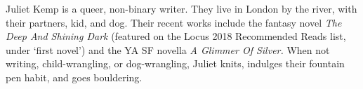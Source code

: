 {Juliet Kemp} is a queer, non-binary writer. They live in London by
the river, with their partners, kid, and dog. Their recent works
include the fantasy novel \textit{The Deep And Shining Dark} (featured
on the Locus 2018 Recommended Reads list, under `first novel') and the
YA SF novella \textit{A Glimmer Of Silver.}  When not writing,
child-wrangling, or dog-wrangling, Juliet knits, indulges their
fountain pen habit, and goes bouldering.
